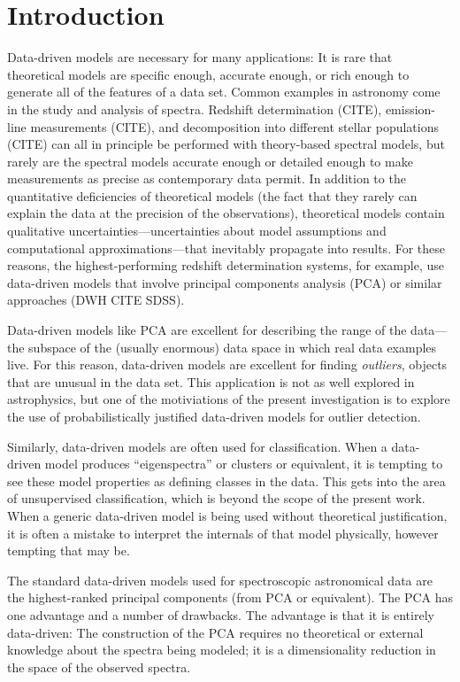 \documentclass[12pt,preprint]{aastex}
\begin{document}
\section{Introduction}\label{sec:introduction}
Data-driven models are necessary for many applications: It is rare
that theoretical models are specific enough, accurate enough, or rich
enough to generate all of the features of a data set.  Common examples
in astronomy come in the study and analysis of spectra.  Redshift
determination (CITE), emission-line measurements (CITE), and
decomposition into different stellar populations (CITE) can all in
principle be performed with theory-based spectral models, but rarely
are the spectral models accurate enough or detailed enough to make
measurements as precise as contemporary data permit.  In addition to
the quantitative deficiencies of theoretical models (the fact that
they rarely can explain the data at the precision of the
observations), theoretical models contain qualitative
uncertainties---uncertainties about model assumptions and
computational approximations---that inevitably propagate into results.
For these reasons, the highest-performing redshift determination
systems, for example, use data-driven models that involve principal
components analysis (PCA) or similar approaches (DWH CITE SDSS).

Data-driven models like PCA are excellent for describing the range of
the data---the subspace of the (usually enormous) data space in which
real data examples live.  For this reason, data-driven models are
excellent for finding \emph{outliers}, objects that are unusual in the
data set.  This application is not as well explored in astrophysics,
but one of the motiviations of the present investigation is to explore
the use of probabilistically justified data-driven models for outlier
detection.

Similarly, data-driven models are often used for classification.  When
a data-driven model produces ``eigenspectra'' or clusters or
equivalent, it is tempting to see these model properties as defining
classes in the data.  This gets into the area of unsupervised
classification, which is beyond the scope of the present work.  When a
generic data-driven model is being used without theoretical
justification, it is often a mistake to interpret the internals of
that model physically, however tempting that may be.

The standard data-driven models used for spectroscopic astronomical
data are the highest-ranked principal components (from PCA or
equivalent). The PCA has one advantage and a number of drawbacks.  The
advantage is that it is entirely data-driven: The construction of the
PCA requires no theoretical or external knowledge about the spectra
being modeled; it is a dimensionality reduction in the space of the
observed spectra.
\end{document}
